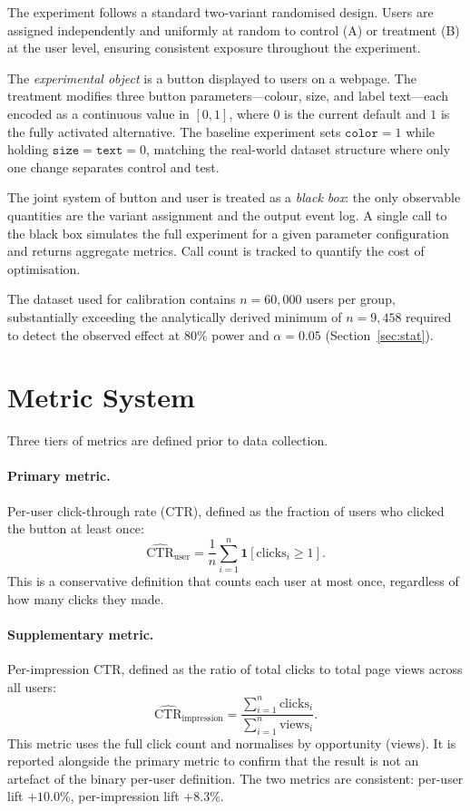 \documentclass[a4paper,12pt]{extarticle}
\numberwithin{equation}{section}
\begin{document}
The experiment follows a standard two-variant randomised design. Users are
assigned independently and uniformly at random to control (A) or treatment
(B) at the user level, ensuring consistent exposure throughout the
experiment.

The \emph{experimental object} is a button displayed to users on a webpage.
The treatment modifies three button parameters---colour, size, and label
text---each encoded as a continuous value in $[0, 1]$, where $0$ is the
current default and $1$ is the fully activated alternative. The baseline
experiment sets $\texttt{color} = 1$ while holding $\texttt{size} =
\texttt{text} = 0$, matching the real-world dataset structure where only
one change separates control and test.

The joint system of button and user is treated as a \emph{black box}: the
only observable quantities are the variant assignment and the output event
log. A single call to the black box simulates the full experiment for a
given parameter configuration and returns aggregate metrics. Call count is
tracked to quantify the cost of optimisation.

The dataset used for calibration contains $n = 60{,}000$ users per group,
substantially exceeding the analytically derived minimum of $n = 9{,}458$
required to detect the observed effect at $80\%$ power and $\alpha = 0.05$
(Section~\ref{sec:stat}).

\section{Metric System}

Three tiers of metrics are defined prior to data collection.

\paragraph{Primary metric.} Per-user click-through rate (CTR), defined
as the fraction of users who clicked the button at least once:
\[
    \widehat{\mathrm{CTR}}_{\text{user}} = \frac{1}{n} \sum_{i=1}^{n}
    \mathbf{1}[\text{clicks}_i \geq 1].
\]
This is a conservative definition that counts each user at most once,
regardless of how many clicks they made.

\paragraph{Supplementary metric.} Per-impression CTR, defined as the ratio
of total clicks to total page views across all users:
\[
    \widehat{\mathrm{CTR}}_{\text{impression}} =
    \frac{\sum_{i=1}^{n} \text{clicks}_i}{\sum_{i=1}^{n} \text{views}_i}.
\]
This metric uses the full click count and normalises by opportunity (views).
It is reported alongside the primary metric to confirm that the result is
not an artefact of the binary per-user definition. The two metrics are
consistent: per-user lift $+10.0\%$, per-impression lift $+8.3\%$.
\end{document}
